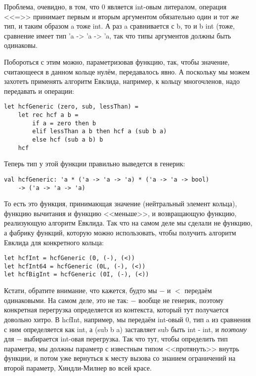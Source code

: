 \documentclass{../../text-style}
\begin{document}
Проблема, очевидно, в том, что 0 является int-овым литералом, операция <<=>> принимает первым и вторым аргументом обязательно один и тот же тип, и таким образом a тоже int. А раз a сравнивается с b, то и b int (тоже, сравнение имеет тип  'a -> 'a -> 'a, так что типы аргументов должны быть одинаковы.

Побороться с этим можно, параметризовав функцию, так, чтобы значение, считающееся в данном кольце нулём, передавалось явно. А поскольку мы можем захотеть применять алгоритм Евклида, например, к кольцу многочленов, надо передавать и операции:

\begin{verbatim}
let hcfGeneric (zero, sub, lessThan) =
    let rec hcf a b =
        if a = zero then b
        elif lessThan a b then hcf a (sub b a)
        else hcf (sub a b) b
    hcf    
\end{verbatim}

Теперь тип у этой функции правильно выведется в генерик:

\begin{verbatim}
val hcfGeneric: 'a * ('a -> 'a -> 'a) * ('a -> 'a -> bool) 
    -> ('a -> 'a -> 'a)
\end{verbatim}

То есть это функция, принимающая значение (нейтральный элемент кольца), функцию вычитания и функцию <<меньше>>, и возвращающую функцию, реализующую алгоритм Евклида. Так что на самом деле мы сделали не функцию, а фабрику функций, которую можно использовать, чтобы получить алгоритм Евклида для конкретного кольца:

\begin{verbatim}
let hcfInt = hcfGeneric (0, (-), (<))
let hcfInt64 = hcfGeneric (0L, (-), (<))
let hcfBigInt = hcfGeneric (0I, (-), (<))
\end{verbatim}

Кстати, обратите внимание, что кажется, будто мы $-$ и $<$ передаём одинаковыми. На самом деле, это не так: $-$ вообще не генерик, поэтому конкретная перегрузка определяется из контекста, который тут получается довольно хитро. В hcfInt, например, мы передаём int-овый 0, тип a из сравнения с ним определяется как int, а (sub b a) заставляет sub быть int - int, и \emph{поэтому} для $-$ выбирается int-овая перегрузка. Так что тут, чтобы определить тип параметра, мы должны параметр с известным типом <<протянуть>> внутрь функции, и потом уже вернуться к месту вызова со знанием ограничений на второй параметр, Хиндли-Милнер во всей красе.
\end{document}
